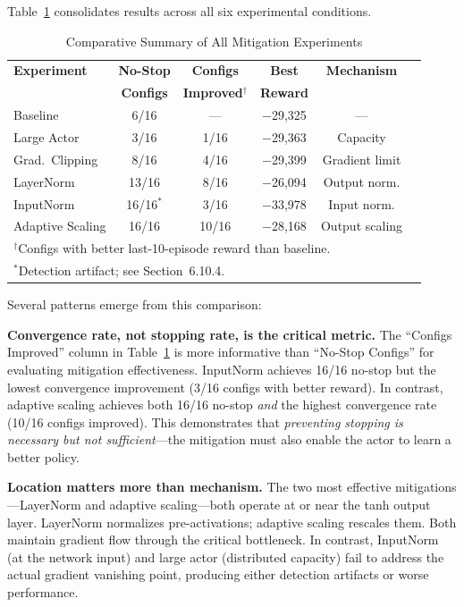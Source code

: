 Table~\ref{tab:mitigation_summary} consolidates results across all six experimental conditions.

\begin{table}[htbp]
\caption{Comparative Summary of All Mitigation Experiments}
\label{tab:mitigation_summary}
\centering
\small
\begin{tabular}{lccccc}
\toprule
\textbf{Experiment} & \textbf{No-Stop} & \textbf{Configs} & \textbf{Best} & \textbf{Mechanism} \\
 & \textbf{Configs} & \textbf{Improved$^\dagger$} & \textbf{Reward} & \\
\midrule
Baseline & 6/16 & --- & $-$29,325 & --- \\
Large Actor & 3/16 & 1/16 & $-$29,363 & Capacity \\
Grad.\ Clipping & 8/16 & 4/16 & $-$29,399 & Gradient limit \\
LayerNorm & 13/16 & 8/16 & $-$26,094 & Output norm. \\
InputNorm & 16/16$^*$ & 3/16 & $-$33,978 & Input norm. \\
Adaptive Scaling & 16/16 & 10/16 & $-$28,168 & Output scaling \\
\bottomrule
\multicolumn{5}{l}{\footnotesize $^\dagger$Configs with better last-10-episode reward than baseline.} \\
\multicolumn{5}{l}{\footnotesize $^*$Detection artifact; see Section~6.10.4.}
\end{tabular}
\end{table}

Several patterns emerge from this comparison:

\textbf{Convergence rate, not stopping rate, is the critical metric.} The ``Configs Improved'' column in Table~\ref{tab:mitigation_summary} is more informative than ``No-Stop Configs'' for evaluating mitigation effectiveness. InputNorm achieves 16/16 no-stop but the lowest convergence improvement (3/16 configs with better reward). In contrast, adaptive scaling achieves both 16/16 no-stop \textit{and} the highest convergence rate (10/16 configs improved). This demonstrates that \textit{preventing stopping is necessary but not sufficient}---the mitigation must also enable the actor to learn a better policy.

\textbf{Location matters more than mechanism.} The two most effective mitigations---LayerNorm and adaptive scaling---both operate at or near the tanh output layer. LayerNorm normalizes pre-activations; adaptive scaling rescales them. Both maintain gradient flow through the critical bottleneck. In contrast, InputNorm (at the network input) and large actor (distributed capacity) fail to address the actual gradient vanishing point, producing either detection artifacts or worse performance.

